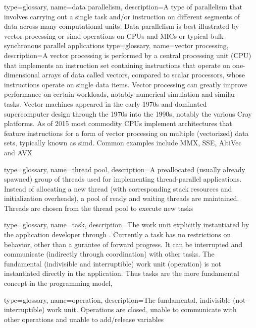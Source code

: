 {
  type=glossary,
  name={data parallelism},
  description={A type of parallelism that involves carrying out a single task
    and/or instruction on different segments of data across many computational
      units. Data parallelism is best illustrated by \gls{vector processing} or \gls{simd} operations on
      \glspl{CPU} and \glspl{MIC} or typical \gls{bulk synchronous} parallel applications}
}
{
  type=glossary,
  name={vector processing},
  description={A vector processing is performed by a central
  processing unit (\gls{CPU}) that implements an instruction set containing
  instructions that operate on one-dimensional arrays of data called
  vectors, compared to scalar processors, whose instructions operate
  on single data items. Vector processing can greatly improve
  performance on certain workloads, notably numerical simulation and
  similar tasks. Vector machines appeared in the early 1970s and
  dominated supercomputer design through the 1970s into the 1990s,
  notably the various Cray platforms. As of 2015 most commodity \glspl{CPU}
  implement architectures that feature instructions for a form of
  vector processing on multiple (vectorized) data sets, typically
  known as \gls{simd}. Common examples include MMX, \gls{SSE},
  AltiVec and \gls{AVX}}
}

{
  type=glossary,
  name={thread pool},
  description={A preallocated (usually already spawned) group of threads used for implementing thread-parallel applications.
  Instead of allocating a new thread (with corresponding stack resources and initialization overheads),
  a pool of ready and waiting threads are maintained.
  Threads are chosen from the thread pool to execute new tasks}
}

{
  type=glossary,
  name={task},
  description={The work unit explicitly instantiated by the application developer through .
  Currently a task has no restrictions on behavior, other than a gurantee of forward progress.
  It can be interrupted and communicate (indirectly through coordination) with other tasks.
  The fundamental (indivisible and interruptible) work unit (\gls{operation}) is not instantiated directly
  in the application. Thus tasks are the more fundamental concept in the programming model},
}

{
  type=glossary,
  name={operation},
  description={The fundamental, indivisible (not-interruptible) work unit.
  Operations are closed, unable to communicate with other operations and unable to add/release variables}
}

